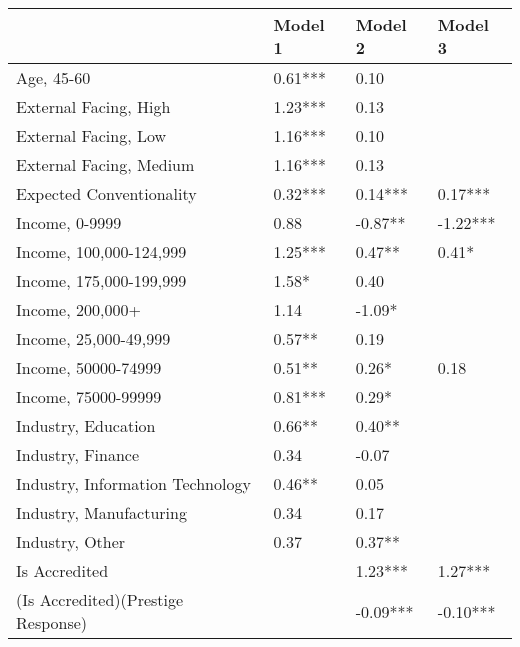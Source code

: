 \begin{table}
    \begin{center}
        \begin{tabular}{llll}
            \hline
                       & Model 1 & Model 2 & Model 3 \\
            \hline
            Age, 45-60                         & 0.61*** & 0.10    &         \\
            External Facing, High              & 1.23*** & 0.13     &          \\
            External Facing, Low               & 1.16*** & 0.10     &          \\
            External Facing, Medium            & 1.16*** & 0.13     &          \\
            Expected Conventionality           & 0.32*** & 0.14***  & 0.17***  \\
            Income, 0-9999                     & 0.88    & -0.87**  & -1.22*** \\
            Income, 100,000-124,999            & 1.25*** & 0.47**   & 0.41*    \\
            Income, 175,000-199,999            & 1.58*   & 0.40     &          \\
            Income, 200,000+                   & 1.14    & -1.09*   &          \\
            Income, 25,000-49,999              & 0.57**  & 0.19     &          \\
            Income, 50000-74999                & 0.51**  & 0.26*    & 0.18     \\
            Income, 75000-99999                & 0.81*** & 0.29*    &          \\
            Industry, Education                & 0.66**  & 0.40**   &          \\
            Industry, Finance                  & 0.34    & -0.07    &          \\
            Industry, Information Technology   & 0.46**  & 0.05     &          \\
            Industry, Manufacturing            & 0.34    & 0.17     &          \\
            Industry, Other                    & 0.37    & 0.37**   &          \\
            Is Accredited                      &         & 1.23***  & 1.27***  \\
            (Is Accredited)(Prestige Response) &         & -0.09*** & -0.10*** \\

\end{tabular}
\end{center}
\end{table}
